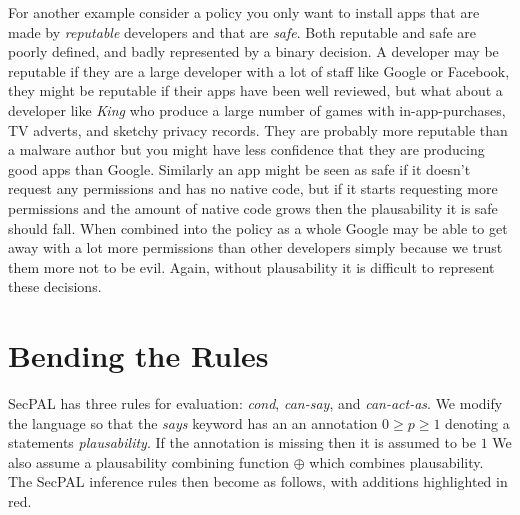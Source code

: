 \documentclass[a4paper]{article}
\newcommand{\new}[1]{{\color{BrickRed} #1}}
\begin{document}
For another example consider a policy you only want to install apps that are made by \emph{reputable} developers and that are \emph{safe}.
Both reputable and safe are poorly defined, and badly represented by a binary decision.
A developer may be reputable if they are a large developer with a lot of staff like Google or Facebook, they might be reputable if their apps have been well reviewed, but what about a developer like \emph{King} who produce a large number of games with in-app-purchases, TV adverts, and sketchy privacy records.  They are probably more reputable than a malware author but you might have less confidence that they are producing good apps than Google.  Similarly an app might be seen as safe if it doesn't request any permissions and has no native code, but if it starts requesting more permissions and the amount of native code grows then the plausability it is safe should fall. 
When combined into the policy as a whole Google may be able to get away with a lot more permissions than other developers simply because we trust them more not to be evil.
Again, without plausability it is difficult to represent these decisions.

\section{Bending the Rules}

SecPAL has three rules for evaluation: \emph{cond}, \emph{can-say}, and \emph{can-act-as}.
We modify the language so that the \emph{says} keyword has an an annotation $0 \geq p \geq 1$ denoting a statements \emph{plausability}.
If the annotation is missing then it is assumed to be $1$
We also assume a plausability combining function $\oplus$ which combines plausability.
The SecPAL inference rules then become as follows, with additions highlighted in \new{red}. 
\end{document}
